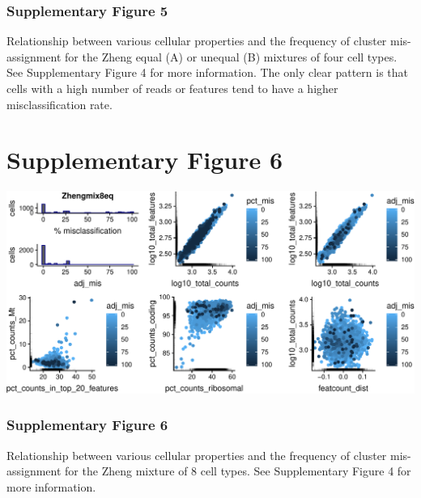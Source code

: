 \documentclass[]{article}
\begin{document}
\vfill

\hypertarget{supplementary-figure-5-1}{%
\subsubsection{Supplementary Figure 5}\label{supplementary-figure-5-1}}

Relationship between various cellular properties and the frequency of
cluster mis-assignment for the Zheng equal (A) or unequal (B) mixtures
of four cell types. See Supplementary Figure 4 for more information. The
only clear pattern is that cells with a high number of reads or features
tend to have a higher misclassification rate.

\newpage

\hypertarget{supplementary-figure-6}{%
\section{Supplementary Figure 6}\label{supplementary-figure-6}}

\includegraphics{supp_figures_files/figure-latex/unnamed-chunk-7-1.pdf}

\vfill

\hypertarget{supplementary-figure-6-1}{%
\subsubsection{Supplementary Figure 6}\label{supplementary-figure-6-1}}

Relationship between various cellular properties and the frequency of
cluster mis-assignment for the Zheng mixture of 8 cell types. See
Supplementary Figure 4 for more information.

\newpage


\end{document}
